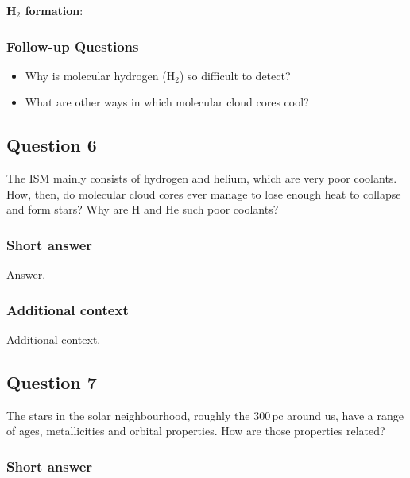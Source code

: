 \documentclass[a4paper,10pt]{article}
\begin{document}
{\noindent}\textbf{H$_2$ formation}: 

\subsubsection{Follow-up Questions}

\begin{itemize}
    \item Why is molecular hydrogen (H$_2$) so difficult to detect?
    \item What are other ways in which molecular cloud cores cool?
\end{itemize}


\newpage
\subsection{Question 6}

The ISM mainly consists of hydrogen and helium, which are very poor coolants. How, then, do molecular cloud cores ever manage to lose enough heat to collapse and form stars? Why are H
and He such poor coolants?

\subsubsection{Short answer}

Answer.

\subsubsection{Additional context}

Additional context.


\newpage
\subsection{Question 7}

The stars in the solar neighbourhood, roughly the $300\,\mathrm{pc}$ around us, have a range of ages, metallicities and orbital properties. How are those properties related?

\subsubsection{Short answer}
\end{document}
